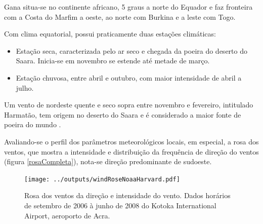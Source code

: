 
Gana situa-se no continente africano, 5 graus a norte do Equador e 
faz fronteira com a Costa do Marfim a oeste, ao norte com Burkina
e a leste com Togo. 

Com clima equatorial, possui praticamente duas estações climáticas:

\begin{itemize}
  \item Estação seca, caracterizada pelo ar seco e chegada da poeira do deserto 
        do Saara. Inicia-se em novembro se estende até metade de março.
  \item Estação chuvosa, entre abril e outubro, com maior intensidade de abril a
        julho.
\end{itemize}

Um vento de nordeste quente e seco sopra entre novembro e fevereiro,
intitulado Harmatão, tem origem no deserto do Saara e é considerado 
a maior fonte de poeira do mundo \citep{breuning2005}.


Avaliando-se o perfil dos parâmetros meteorológicos locais, em especial, 
a rosa dos ventos, que mostra a intensidade e distribuição da frequência de 
direção do ventos (figura \ref{rosaCompleta}),
nota-se direção predominante de sudoeste. 

\begin{figure}[H]
  \centering
  \texttt{[image: ../outputs/windRoseNoaaHarvard.pdf]}
  \caption{Rosa dos ventos da direção e intensidade do vento. 
           Dados horários de setembro de 2006 à junho de 2008 do 
           Kotoka International Airport, aeroporto de Acra. 
           \label{fg:rosaCompleta}}
\end{figure}

